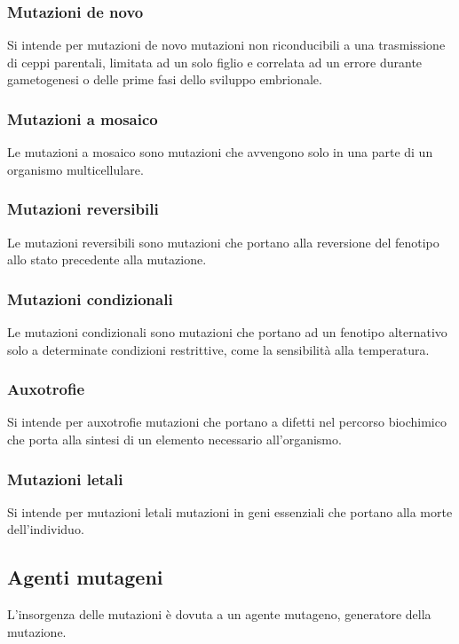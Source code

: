 		\subsubsection{Mutazioni de novo}
		Si intende per mutazioni de novo mutazioni non riconducibili a una trasmissione di ceppi parentali, limitata ad un solo figlio e correlata ad un errore durante gametogenesi o delle prime fasi dello sviluppo embrionale.

		\subsubsection{Mutazioni a mosaico}
		Le mutazioni a mosaico sono mutazioni che avvengono solo in una parte di un organismo multicellulare.

		\subsubsection{Mutazioni reversibili}
		Le mutazioni reversibili sono mutazioni che portano alla reversione del fenotipo allo stato precedente alla mutazione.

		\subsubsection{Mutazioni condizionali}
		Le mutazioni condizionali sono mutazioni che portano ad un fenotipo alternativo solo a determinate condizioni restrittive, come la sensibilit\`a alla temperatura.

		\subsubsection{Auxotrofie}
		Si intende per auxotrofie mutazioni che portano a difetti nel percorso biochimico che porta alla sintesi di un elemento necessario all'organismo.

		\subsubsection{Mutazioni letali}
		Si intende per mutazioni letali mutazioni in geni essenziali che portano alla morte dell'individuo.

	\subsection{Agenti mutageni}
	L'insorgenza delle mutazioni \`e dovuta a un agente mutageno, generatore della mutazione.

